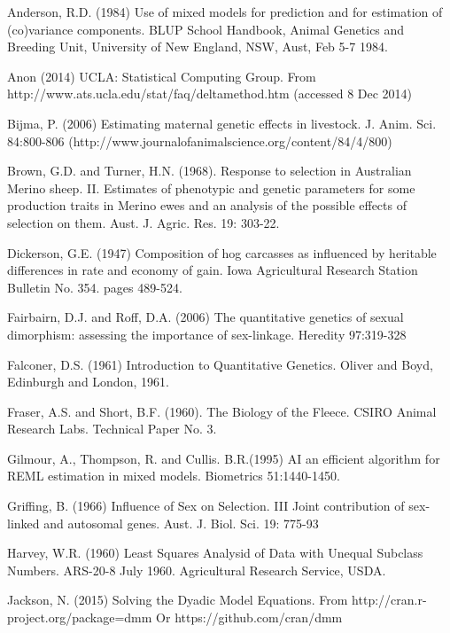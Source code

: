 \documentclass[titlepage]{article}  %
\begin{document}
\clearpage
\begin{thebibliography}{99}

Anderson, R.D. (1984) Use of mixed models for prediction and for estimation 
    of (co)variance components. BLUP School Handbook, Animal Genetics and
    Breeding Unit, University of New England, NSW, Aust, Feb 5-7 1984.

Anon (2014) UCLA: Statistical Computing Group. 
    From http://www.ats.ucla.edu/stat/faq/deltamethod.htm (accessed 8 Dec 2014)

Bijma, P. (2006) Estimating maternal genetic effects in livestock.
    J. Anim. Sci. 84:800-806
    (http://www.journalofanimalscience.org/content/84/4/800)

Brown, G.D. and Turner, H.N. (1968).  Response to selection in Australian
    Merino sheep.  II. Estimates of phenotypic and genetic parameters for
    some production traits in Merino ewes and an analysis of the possible
    effects of selection on them.  Aust. J. Agric. Res. 19: 303-22.

Dickerson, G.E. (1947) Composition of hog carcasses as influenced by heritable
    differences in rate and economy of gain. Iowa Agricultural Research
    Station Bulletin No. 354. pages 489-524.

Fairbairn, D.J. and Roff, D.A. (2006) The quantitative genetics of sexual 
    dimorphism: assessing the importance of sex-linkage. Heredity 97:319-328

Falconer, D.S. (1961) Introduction to Quantitative Genetics.
    Oliver and Boyd, Edinburgh and London, 1961.

Fraser, A.S. and Short, B.F. (1960).  The Biology of the Fleece.  CSIRO
    Animal Research Labs.  Technical Paper No. 3.

Gilmour, A., Thompson, R. and Cullis. B.R.(1995) AI an efficient algorithm 
    for REML estimation in mixed models. Biometrics 51:1440-1450.

Griffing, B. (1966) Influence of Sex on Selection.
    III Joint contribution of sex-linked and autosomal genes.
    Aust. J. Biol. Sci. 19: 775-93
 
Harvey, W.R. (1960) Least Squares Analysid of Data with Unequal Subclass
    Numbers. ARS-20-8 July 1960. Agricultural Research Service, USDA.

Jackson, N. (2015) Solving the Dyadic Model Equations. From http://cran.r-project.org/package=dmm  Or https://github.com/cran/dmm


\end{thebibliography}
\end{document}
